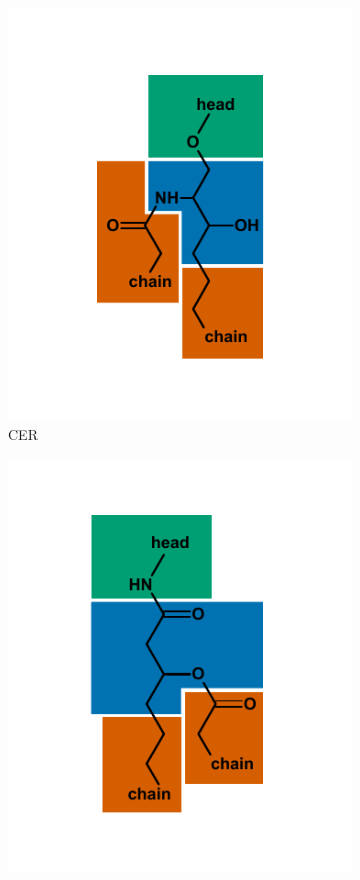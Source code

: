 {\begin{figure}[p]
\begin{subfigure}[b]{.3\linewidth}
    	\includegraphics[width=\linewidth]{figs_ch1/CER}
    	\caption{CER}
        \label{fig:CER}
    \end{subfigure}
    \begin{subfigure}[b]{.3\linewidth}
    	\includegraphics[width=\linewidth]{figs_ch1/FAHFAm}

\end{subfigure}
\end{figure}}
